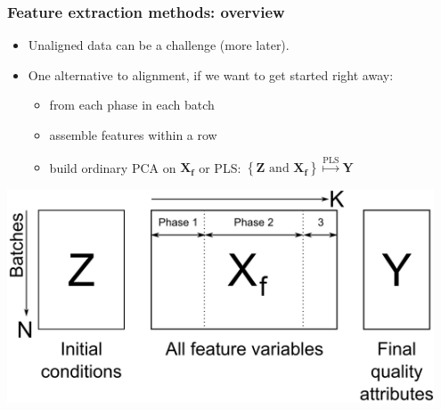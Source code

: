 \begin{frame}\frametitle{Feature extraction methods: overview}

\begin{itemize}
	\item	Unaligned data can be a challenge (more later).
	
	\item	One alternative to alignment, if we want to get started right away: 
	
			\begin{itemize}
				\item	{} from each phase in each batch
				
				\item	assemble features within a row
				
				\item	build ordinary PCA on \( \mathbf{X_f} \) or PLS: \( \left\{ \mathbf{Z} \,\,\text{and}\,\, \mathbf{X_f}\right\} \stackrel{\text{PLS}}{\longmapsto} \mathbf{Y} \)
			\end{itemize}
\end{itemize}

\begin{center}
	\includegraphics[width=0.95\textwidth]{images/data-after-feature-extraction.png}
\end{center}
\end{frame}

